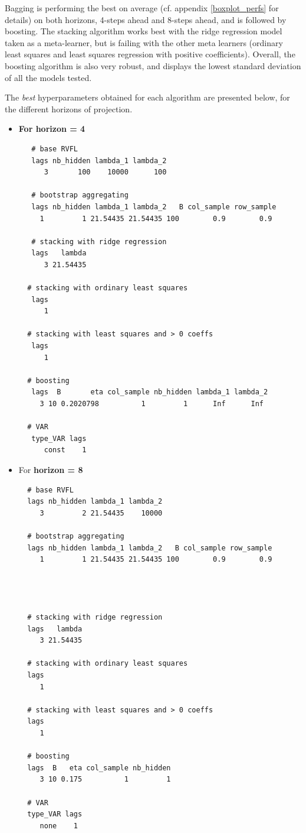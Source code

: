 Bagging is performing the best on average (cf. appendix \ref{boxplot_perfs} for details) on both horizons, 4-steps ahead and 8-steps ahead, and is followed by boosting. The stacking algorithm works best with the ridge regression model taken as a meta-learner, but is failing with the other meta learners (ordinary least squares and least squares regression with positive coefficients). Overall, the boosting algorithm is also very robust, and displays the lowest standard deviation of all the models tested. 

The \textit{best} hyperparameters obtained for each algorithm are presented below, for the different horizons of projection. 

\newpage

\begin{itemize}

\item \textbf{For horizon = 4}

\begin{verbatim}
   # base RVFL
   lags nb_hidden lambda_1 lambda_2  
      3       100    10000      100 
  
   # bootstrap aggregating
   lags nb_hidden lambda_1 lambda_2   B col_sample row_sample 
     1         1 21.54435 21.54435 100        0.9        0.9 
   
   # stacking with ridge regression
   lags   lambda   
      3 21.54435 
  
  # stacking with ordinary least squares
   lags 
      1 
  
  # stacking with least squares and > 0 coeffs
   lags  
      1 
  
  # boosting
   lags  B       eta col_sample nb_hidden lambda_1 lambda_2   
     3 10 0.2020798          1         1      Inf      Inf 
  
  # VAR
   type_VAR lags   
      const    1 
\end{verbatim}

\item For \textbf{horizon = 8}
\begin{verbatim}
  # base RVFL
  lags nb_hidden lambda_1 lambda_2   
     3         2 21.54435    10000 
  
  # bootstrap aggregating
  lags nb_hidden lambda_1 lambda_2   B col_sample row_sample  
     1         1 21.54435 21.54435 100        0.9        0.9 
  
 
 
 
  # stacking with ridge regression
  lags   lambda   
     3 21.54435 
  
  # stacking with ordinary least squares
  lags 
     1 
  
  # stacking with least squares and > 0 coeffs
  lags 
     1 
  
  # boosting
  lags  B   eta col_sample nb_hidden 
     3 10 0.175          1         1 
  
  # VAR
  type_VAR lags   
     none    1 
\end{verbatim}

\end{itemize}





